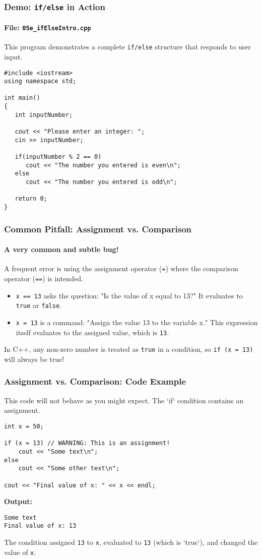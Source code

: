 \documentclass{beamer}
\begin{document}
\begin{frame}[fragile]
\frametitle{Demo: \texttt{if/else} in Action}
\framesubtitle{File: \texttt{05e\_ifElseIntro.cpp}}
This program demonstrates a complete \texttt{if/else} structure that responds to user input.

\begin{verbatim}
#include <iostream>
using namespace std;

int main()
{
   int inputNumber;

   cout << "Please enter an integer: ";
   cin >> inputNumber;

   if(inputNumber % 2 == 0)
      cout << "The number you entered is even\n";
   else
      cout << "The number you entered is odd\n";

   return 0;
}
\end{verbatim}
\end{frame}

\begin{frame}
\frametitle{Common Pitfall: Assignment vs. Comparison}
\framesubtitle{A very common and subtle bug!}

A frequent error is using the assignment operator (\texttt{=}) where the comparison operator (\texttt{==}) is intended.

\begin{itemize}
    \item \texttt{x == 13} asks the question: "Is the value of x equal to 13?" It evaluates to \texttt{true} or \texttt{false}.
    \pause
    \item \texttt{x = 13} is a command: "Assign the value 13 to the variable x." This expression itself evaluates to the assigned value, which is \texttt{13}.
\end{itemize}

In C++, any non-zero number is treated as \texttt{true} in a condition, so \texttt{if (x = 13)} will \alert{always} be true!
\end{frame}

\begin{frame}[fragile]
\frametitle{Assignment vs. Comparison: Code Example}
This code will not behave as you might expect. The `if` condition contains an assignment.

\begin{verbatim}
int x = 50;

if (x = 13) // WARNING: This is an assignment!
    cout << "Some text\n";
else
    cout << "Some other text\n";

cout << "Final value of x: " << x << endl;
\end{verbatim}
\pause
\vfill
\textbf{Output:}
\begin{verbatim}
Some text
Final value of x: 13
\end{verbatim}
The condition assigned \texttt{13} to \texttt{x}, evaluated to \texttt{13} (which is `true`), and changed the value of \texttt{x}.
\end{frame}
\end{document}
